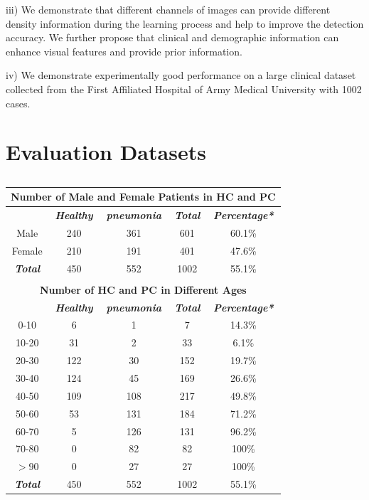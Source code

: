\documentclass[journal]{IEEEtran}
\begin{document}
iii) We demonstrate that different channels of images can provide different density information during the learning process and help to improve the detection accuracy. We further propose that clinical and demographic information can enhance visual features and provide prior information.

iv) We demonstrate experimentally good performance on a large clinical dataset collected from the First Affiliated Hospital of Army Medical University with 1002 cases.


\section{Evaluation Datasets}
\label{dataset}
\begin{table}[htbp]
    \vspace{-0cm}
    \caption{}
    \vspace{-0cm}
    \begin{center}
    \begin{tabular}{c|c|c|c|c}
    \multicolumn{5}{c}{\textbf{Number of Male and Female Patients in HC and PC}} \\
    \hline
    \textbf{\textit{}} & \textbf{\textit{Healthy}} & \textbf{\textit{pneumonia}}& \textbf{\textit{Total}}& \textbf{\textit{Percentage*}} \\
    \hline
    Male & 240 & 361 & 601 & 60.1\%\\
    Female & 210 & 191 & 401 &47.6\% \\
    \hline
    \textbf{\textit{Total}} & 450 & 552 & 1002 & 55.1\% \\
    
    \hline
    \multicolumn{5}{c}{}\\
    \multicolumn{5}{c}{\textbf{Number of HC and PC in Different Ages}} \\

    \hline
    \textbf{\textit{}} & \textbf{\textit{Healthy}} & \textbf{\textit{pneumonia}}& \textbf{\textit{Total}}& \textbf{\textit{Percentage*}} \\
    \hline
    0-10 & 6 & 1 & 7 & 14.3\%\\
    10-20 & 31 & 2 & 33 & 6.1\%\\
    20-30 & 122 & 30 & 152 & 19.7\%\\
    30-40 & 124 & 45 & 169 &26.6\%\\
    40-50 & 109 & 108 & 217 &49.8\%\\
    50-60 & 53 & 131 & 184 &71.2\%\\
    60-70 & 5 & 126 & 131 &96.2\%\\
    70-80 & 0 & 82 & 82 &100\%\\
    $>90$& 0 & 27 & 27 &100\%\\
    \hline 
    \textbf{\textit{Total}} & 450 & 552 & 1002 & 55.1\% \\


\end{tabular}
\end{center}
\end{table}
\end{document}
